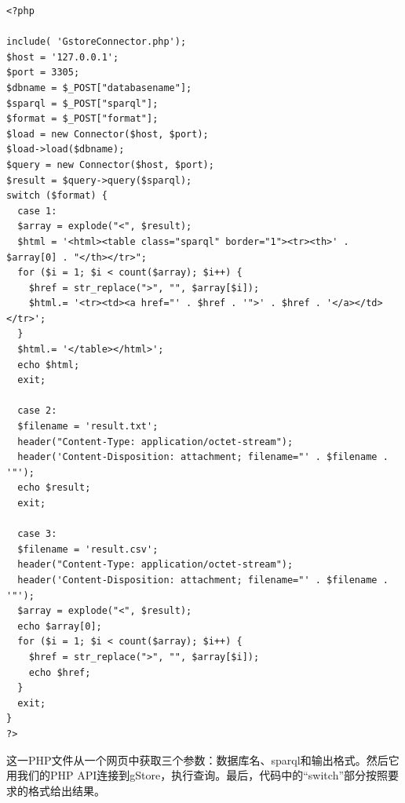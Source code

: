 \documentclass[titlepage, a4paper, 12pt]{article}
\begin{document}
\begin{verbatim}
<?php

include( 'GstoreConnector.php');
$host = '127.0.0.1';
$port = 3305;
$dbname = $_POST["databasename"];
$sparql = $_POST["sparql"];
$format = $_POST["format"];
$load = new Connector($host, $port);
$load->load($dbname);
$query = new Connector($host, $port);
$result = $query->query($sparql);
switch ($format) {
  case 1:
  $array = explode("<", $result);
  $html = '<html><table class="sparql" border="1"><tr><th>' . $array[0] . "</th></tr>";
  for ($i = 1; $i < count($array); $i++) {
    $href = str_replace(">", "", $array[$i]);
    $html.= '<tr><td><a href="' . $href . '">' . $href . '</a></td></tr>';
  }
  $html.= '</table></html>';
  echo $html;
  exit;

  case 2:
  $filename = 'result.txt';
  header("Content-Type: application/octet-stream");
  header('Content-Disposition: attachment; filename="' . $filename . '"');
  echo $result;
  exit;

  case 3:
  $filename = 'result.csv';
  header("Content-Type: application/octet-stream");
  header('Content-Disposition: attachment; filename="' . $filename . '"');
  $array = explode("<", $result);
  echo $array[0];
  for ($i = 1; $i < count($array); $i++) {
    $href = str_replace(">", "", $array[$i]);
    echo $href;
  }
  exit;
}
?>
\end{verbatim}

这一PHP文件从一个网页中获取三个参数：数据库名、sparql和输出格式。然后它用我们的PHP API连接到gStore，执行查询。最后，代码中的“switch”部分按照要求的格式给出结果。 
\end{document}
